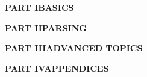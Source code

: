 \documentclass{article}
\def\part#1#2{\vfil\Huge\textbf{PART #1}\vfil\LARGE\textbf{#2}}
\begin{document}




\part{I}{BASICS}






\part{II}{PARSING}







\part{III}{ADVANCED TOPICS}





\part{IV}{APPENDICES}





\end{document}

